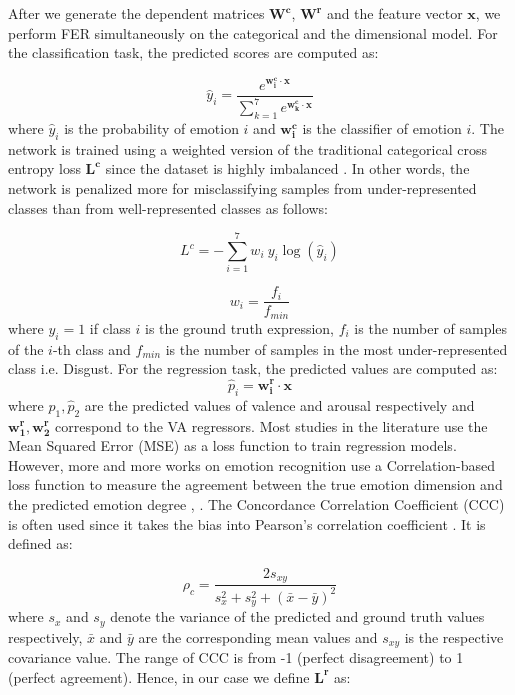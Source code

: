 \documentclass[a4paper, 10pt, conference]{ieeeconf}      \usepackage{FG2021}
\begin{document}
After we generate the dependent matrices $\mathbf{W^{c}}$, $\mathbf{W^{r}}$ and the feature vector $\mathbf{x}$, we perform FER simultaneously on the categorical and the dimensional model. For the classification task, the predicted scores are computed as:

\begin{equation}
    \hat{y}_i = \frac{e^{\mathbf{w_i^{c}} \cdot \mathbf{x}}}{\sum_{k=1}^7 e^{\mathbf{w_k^{c}} \cdot \mathbf{x}}}
\end{equation}
where $\hat{y}_i$ is the probability of emotion $i$ and $\mathbf{w_i^{c}}$ is the classifier of emotion $i$. The network is trained using a weighted version of the traditional categorical cross entropy loss $\mathbf{L^{c}}$ since the dataset is highly imbalanced \cite{mollahosseini2017affectnet}. In other words, the network is penalized more for misclassifying samples from under-represented classes than from well-represented classes as follows:

\begin{equation}
    L^{c} = - \sum_{i=1}^7 w_i \ y_i \log (\hat{y}_i)
    \label{eqn:weighted_ce}
\end{equation}

\begin{equation}
    w_i = \frac{f_i}{f_{min}}
    \label{eqn:weight}
\end{equation}
where $y_i = 1$ if class $i$ is the ground truth expression, $f_i$ is the number of samples of the $i$-th class and $f_{min}$ is the number of samples in the most under-represented class i.e. Disgust. For the regression task, the predicted values are computed as:
\begin{equation}
    \hat{p}_i = \mathbf{w^{r}_i} \cdot \mathbf{x}
\end{equation}
where $\hat{p}_1, \hat{p}_2$ are the predicted values of valence and arousal respectively and $ \mathbf{w^{r}_1}, \mathbf{w^{r}_2}$ correspond to the VA regressors. Most studies in the literature use the Mean Squared Error (MSE) as a loss function to train regression models. However, more and more works on emotion recognition use a Correlation-based loss function to measure the agreement between the true emotion dimension and the predicted emotion degree \cite{kollias2019expression}, \cite{han2017hard}. The Concordance Correlation Coefficient (CCC) is often used since it takes the bias into Pearson’s correlation coefficient \cite{atmaja2020evaluation}. It is defined as:

\begin{equation}
    \rho_c = \frac{2 s_{xy}}{s_x^2 + s_y^2 + (\bar{x} - \bar{y})^2}
\end{equation}
where $s_x$ and $s_y$ denote the variance of the predicted and ground truth values respectively, $\bar{x}$ and $\bar{y}$ are the corresponding mean values and $s_{xy}$ is the respective covariance value. The range of CCC is from -1 (perfect disagreement) to 1 (perfect agreement). Hence, in our case we define $\mathbf{L^{r}}$ as:
\end{document}
